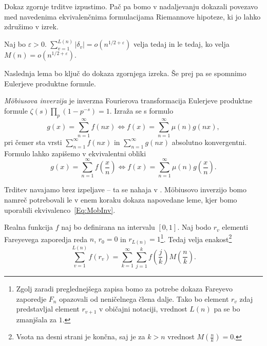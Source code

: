 \documentclass[mat1]{fmfdelo}
\begin{document}
Dokaz zgornje trditve izpustimo. Pač pa bomo v nadaljevanju dokazali povezavo med navedenima ekvivalenčnima formulacijama Riemannove hipoteze, ki jo lahko združimo v izrek.

\begin{izrek}
Naj bo $\varepsilon > 0$. \( \sum_{v=1}^{L(n)}|\delta_{v}| = o(n^{1/2+\varepsilon}) \) velja tedaj in le tedaj, ko velja \( M(n) = o(n^{1/2+\varepsilon}). \)
\end{izrek}

Naslednja lema bo ključ do dokaza zgornjega izreka. Še prej pa se spomnimo Eulerjeve produktne formule.

\begin{trditev}
\emph{M\"obiusova inverzija} je inverzna Fourierova transformacija Eulerjeve produktne formule \( \zeta(s) \prod_{p} (1-p^{-s}) = 1. \) 
Izraža se s formulo
\begin{equation}
g(x) = \sum_{n=1}^{\infty} f(nx) \Longleftrightarrow f(x) = \sum_{n=1}^{\infty} \mu(n) g(nx),
\end{equation}
pri čemer sta vrsti $\sum_{n=1}^{\infty} f(nx)$ in $\sum_{n=1}^{\infty} g(nx)$ absolutno konvergentni.
Formulo lahko zapišemo v ekvivalentni obliki
\begin{equation}
\label{Eq:MobInv}
g(x) = \sum_{n=1}^{\infty} f \left(\frac{x}{n} \right) \Longleftrightarrow f(x) = \sum_{n=1}^{\infty} \mu(n) g \left(\frac{x}{n} \right).
\end{equation}
%
\end{trditev}

Trditev navajamo brez izpeljave -- ta se nahaja v \cite[poglavje 10.9]{zetafunction}. M\"obiusovo inverzijo bomo namreč potrebovali le v enem koraku dokaza napovedane leme, kjer bomo uporabili ekvivalenco~\eqref{Eq:MobInv}.

\begin{lema}
\label{Lema:RiemFar}
Realna funkcija $f$ naj bo definirana na intervalu $[0,1]$. Naj bodo $r_{v}$ elementi Fareyevega zaporedja reda $n$, $r_{0}=0$ in $r_{L(n)}=1$\footnote{Zgolj zaradi preglednejšega zapisa bomo za potrebe dokaza Fareyevo zaporedje $F_{n}$ opazovali od neničelnega člena dalje. Tako bo element $r_{v}$ zdaj predstavljal element $r_{v+1}$ v običajni notaciji, vrednost $L(n)$ pa se bo zmanjšala za $1$.}. Tedaj velja enakost\footnote{Vsota na desni strani je končna, saj je za $k>n$ vrednost $M(\frac{n}{k})=0$.}
\begin{equation}
\label{Eq:RiemFar1}
	\sum_{v=1}^{L(n)} f(r_v) = \sum_{k=1}^{\infty} \sum_{j=1}^{k} f \left(\frac{j}{k} \right) M \left(\frac{n}{k} \right).
\end{equation}
\end{lema}
\end{document}
